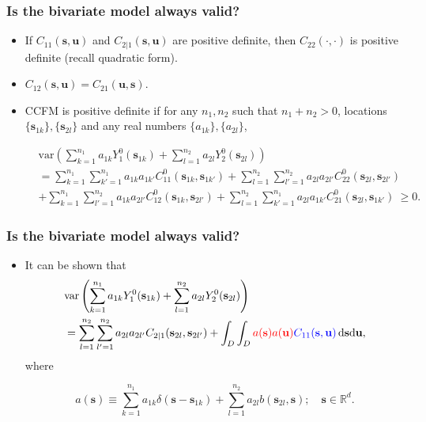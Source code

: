 \documentclass{beamer}
\newcommand{\svec} {\textbf{s}}
\newcommand{\uvec} {\textbf{u}}
\newcommand{\s}{\mathbf{s}}
\renewcommand{\u}{\mathbf{u}}
\renewcommand{\d}{\mathrm{d}}
\newcommand{\var}{\mathrm{var}}
\newcommand{\RR}{\mathbb{R}}
\newcommand{\red}{\textcolor{red}}%
\newcommand{\blue}{\textcolor{blue}}
\begin{document}

\begin{frame}
\frametitle{Is the bivariate model always valid?}

\begin{itemize}
\item If $C_{11}(\svec,\uvec)$ and $C_{2|1}(\svec,\uvec)$ are positive definite, then $C_{22}(\cdot,\cdot)$ is positive definite (recall quadratic form).
\item $C_{12}(\svec,\uvec) = C_{21}(\uvec,\svec)$.
\item CCFM is positive definite if for any $n_1,n_2$ such that $n_1 + n_2 > 0$, locations $\{\svec_{1k}\}, \{\svec_{2l}\}$ and any real numbers $\{a_{1k}\},\{a_{2l}\}$,

\small
\begin{align*}
 & \var\left(\sum_{k=1}^{n_1}{a_{1k}Y_1^0(\s_{1k})}+\sum_{l=1}^{n_2}{a_{2l}Y_2^0(\s_{2l})}\right) \\ &=\sum_{k=1}^{n_1}\sum_{k'=1}^{n_1} a_{1k}a_{1k'}C_{11}^0(\s_{1k},\s_{1k'})+\sum_{l=1}^{n_2}\sum_{l'=1}^{n_2} a_{2l}a_{2l'}C_{22}^0(\s_{2l},\s_{2l'}) \\
  &+\sum_{k=1}^{n_1}\sum_{l'=1}^{n_2} a_{1k}a_{2l'}C_{12}^0(\s_{1k},\s_{2l'})+\sum_{l=1}^{n_2}\sum_{k'=1}^{n_1} a_{2l}a_{1k'}C_{21}^0(\s_{2l},\s_{1k'})~ \ge 0.
\end{align*}

\normalsize
\end{itemize}
\end{frame}


\begin{frame}
\frametitle{Is the bivariate model always valid?}

\begin{itemize}
\item It can be shown that
\begin{align*}
& \var\left(\sum_{k=1}^{n_1}{a_{1k}Y_1^0(\s_{1k})}+\sum_{l=1}^{n_2}{a_{2l}Y_2^0(\s_{2l})}\right)\\
&= \sum_{l=1}^{n_2}\sum_{l'=1}^{n_2}a_{2l}a_{2l'}C_{2\mid 1}(\s_{2l},\s_{2l'})+\int_D \int_D{\red{a(\s)a(\u)}\blue{C_{11}(\s,\u)}\,\d\s\d\u},
\end{align*}
where

\begin{equation*}
a(\s)\equiv \sum_{k=1}^{n_1}a_{1k}\delta(\s-\s_{1k})+\sum_{l=1}^{n_2}a_{2l}b(\s_{2l},\s);\quad \s\in \RR^d.
\end{equation*}

\end{itemize}
\end{frame}
\end{document}

